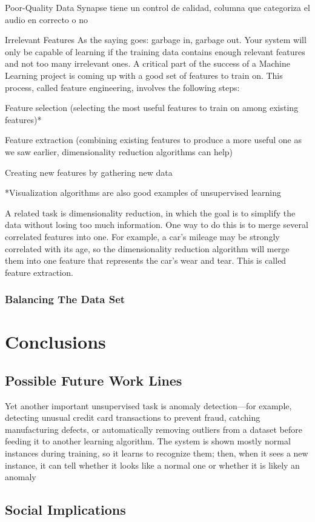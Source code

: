 \documentclass[12pt, a4paper]{article}
\begin{document}
	Poor-Quality Data %
	Synapse tiene un control de calidad, columna que categoriza el audio en correcto o no 
	
	Irrelevant Features
	As the saying goes: garbage in, garbage out. Your system will only be capable of learning if the training data contains enough relevant features and not too many irrelevant ones. A critical part of the success of a Machine Learning project is coming up with a good set of features to train on. This process, called feature engineering, involves the following steps:
	
	Feature selection (selecting the most useful features to train on among existing features)*
	
	Feature extraction (combining existing features to produce a more useful one as we saw earlier, dimensionality reduction algorithms can help)
	
	Creating new features by gathering new data
	
	*Visualization algorithms are also good examples of unsupervised learning
	
	A related task is dimensionality reduction, in which the goal is to simplify the data without losing too much information. One way to do this is to merge several correlated features into one. For example, a car’s mileage may be strongly correlated with its age, so the dimensionality reduction algorithm will merge them into one feature that represents the car’s wear and tear. This is called feature extraction.
	
	\clearpage
	
	\subsubsection{Balancing The Data Set}
	
	
	
	\clearpage
	
	\section{Conclusions}
	
	\clearpage
	
	\subsection{Possible Future Work Lines}
	
	Yet another important unsupervised task is anomaly detection—for example, detecting unusual credit card transactions to prevent fraud, catching manufacturing defects, or automatically removing outliers from a dataset before feeding it to another learning algorithm. The system is shown mostly normal instances during training, so it learns to recognize them; then, when it sees a new instance, it can tell whether it looks like a normal one or whether it is likely an anomaly
	
	\clearpage
	
	\subsection{Social Implications}
	
	
	\clearpage
	
	
	
	
	
	
	
\end{document}
